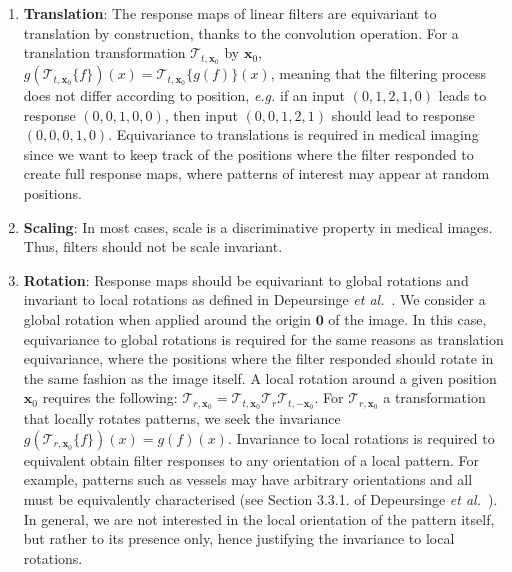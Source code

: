 \documentclass[fleqn,a4paper,oneside,openany]{book}
\begin{document}
\begin{enumerate}
\item \textbf{Translation}: The response maps of linear filters are equivariant to translation by construction, thanks to the convolution operation. For a translation transformation $\mathcal{T}_{t,\boldsymbol{x}_0}$ by $\boldsymbol{x}_0$, $g(\mathcal{T}_{t,\boldsymbol{x}_0}\{f\})(x) = \mathcal{T}_{t,\boldsymbol{x}_0}\{g(f)\}(x)$, meaning that the filtering process does not differ according to position, \textit{e.g.} if an input $(0,1,2,1,0)$ leads to response $(0,0,1,0,0)$, then input $(0,0,1,2,1)$ should lead to response $(0,0,0,1,0)$.
Equivariance to translations is required in medical imaging since we want to keep track of the positions where the filter responded to create full response maps, where patterns of interest may appear at random positions.
\item \textbf{Scaling}: In most cases, scale is a discriminative property in medical images. Thus, filters should not be scale invariant. 
\item \textbf{Rotation}: Response maps should be equivariant to global rotations and invariant to local rotations as defined in Depeursinge \textit{et al.}~\cite{DFA2017}.
We consider a global rotation when applied around the origin $\boldsymbol{0}$ of the image.
In this case, equivariance to global rotations is required for the same reasons as translation equivariance, where the positions where the filter responded should rotate in the same fashion as the image itself.
A local rotation around a given position $\boldsymbol{x}_0$ requires the following:
$\mathcal{T}_{r,\boldsymbol{x}_0}=\mathcal{T}_{t,\boldsymbol{x}_0}\mathcal{T}_{r}\mathcal{T}_{t,-\boldsymbol{x}_0}$.
For $\mathcal{T}_{r,\boldsymbol{x}_0}$ a transformation that locally rotates patterns, we seek the invariance $g(\mathcal{T}_{r,\boldsymbol{x}_0}\{f\})(x) = g(f)(x)$. 
Invariance to local rotations is required to equivalent obtain filter responses to any orientation of a local pattern.
For example, patterns such as vessels may have arbitrary orientations and all must be equivalently characterised (see Section 3.3.1. of Depeursinge \textit{et al.}~\cite{DFA2017}).
In general, we are not interested in the local orientation of the pattern itself, but rather to its presence only, hence justifying the invariance to local rotations.
\end{enumerate}
%
\end{document}
